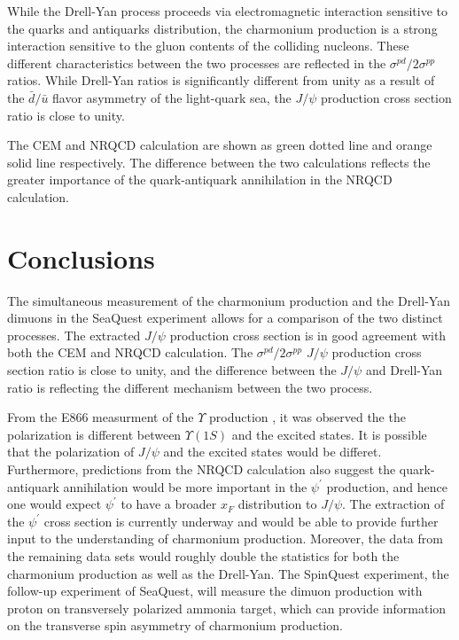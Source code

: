 \documentclass[10pt,a4paper,final]{article}
\begin{document}
While the Drell-Yan process proceeds via electromagnetic interaction sensitive
to the quarks and antiquarks distribution, the charmonium production is a strong
interaction sensitive to the gluon contents of the colliding nucleons. These
different characteristics between the two processes are reflected in the
$\sigma^{pd}/2\sigma^{pp}$ ratios. While Drell-Yan ratios is significantly different
from unity as a result of the $\bar{d}/\bar{u}$ flavor asymmetry of the light-quark sea,
the $J/\psi$ production cross section ratio is close to unity.

The CEM and NRQCD calculation are shown as green dotted line and orange solid line
respectively. The difference between the two calculations reflects the greater
importance of the quark-antiquark annihilation in the NRQCD calculation.

\section{Conclusions}
The simultaneous measurement of the charmonium production and the Drell-Yan dimuons
in the SeaQuest experiment allows for a comparison of the two distinct processes. The
extracted $J/\psi$ production cross section is in good agreement with both the CEM
and NRQCD calculation. The $\sigma^{pd}/2\sigma^{pp}$ $J/\psi$ production cross section ratio
is close to unity, and the difference between the $J/\psi$ and Drell-Yan
ratio is reflecting the different mechanism between the two process.

From the E866 measurment of the $\Upsilon$ production \cite{brown2001}, it was observed the
the polarization is different between $\Upsilon(1S)$ and the excited states. It is possible
that the polarization of $J/\psi$ and the excited states would be differet. Furthermore,
predictions from the NRQCD calculation also suggest the quark-antiquark annihilation would
be more important in the $\psi^\prime$ production, and hence one would expect $\psi^\prime$
to have a broader $x_F$ distribution to $J/\psi$. The extraction of the $\psi^\prime$
cross section is currently underway and would be able to provide further input to
the understanding of charmonium production. Moreover, the data from the remaining
data sets would roughly double the statistics for both the charmonium production as well as the Drell-Yan.
The SpinQuest experiment, the follow-up experiment of SeaQuest, will measure the dimuon
production with proton on transversely polarized ammonia target, which can provide information
on the transverse spin asymmetry of charmonium production.

\printbibliography[heading=bibintoc,title={References}]
\end{document}

